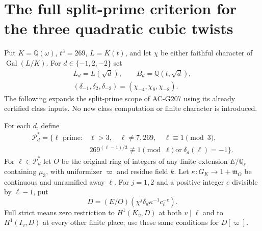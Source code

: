 \section{The full split-prime criterion for the three quadratic cubic twists}
\label{sec:mixed-cubic-split-cube-quadratic}

Put $K=\mathbb Q(\omega)$, $t^3=269$, $L=K(t)$, and let
$\chi$ be either faithful character of $\operatorname{Gal}(L/K)$.
For $d\in\{-1,2,-2\}$ set
\[
 \begin{gathered}
 L_d=L(\sqrt d),\qquad B_d=\mathbb Q(t,\sqrt d),\\
 (\delta_{-1},\delta_2,\delta_{-2})=(\chi_{-4},\chi_8,\chi_{-8}).
 \end{gathered}
 \tag{MCN.1}
\]
The following expands the split-prime scope of AC-G207 using
its already certified class inputs.  No new class computation
or finite character is introduced.

For each $d$, define
\[
 \begin{split}
 \mathscr P_d^* =\{\ell\text{ prime}:{}&\ell>3,\quad\ell\ne7,269,
                    \quad\ell\equiv1\pmod3,\\
 &269^{(\ell-1)/3}\not\equiv1\pmod\ell
                  \ \text{or}\ \delta_d(\ell)=-1\}.
 \end{split}
 \tag{MCN.2}
\]
For $\ell\in\mathscr P_d^*$ let $O$ be the original ring of
integers of any finite extension $E/\mathbb Q_\ell$ containing
$\mu_3$, with uniformizer $\varpi$ and residue field $k$.
Let $\kappa:G_K\to1+\mathfrak m_O$ be continuous and
unramified away $\ell$.  For $j=1,2$ and a positive integer
$e$ divisible by $\ell-1$, put
\[
             D=(E/O)(\chi^j\delta_d\kappa^{-1}c_\ell^{-e}).
 \tag{MCN.3}
\]
Full strict means zero restriction to $H^1(K_v,D)$ at both
$v\mid\ell$ and to $H^1(I_v,D)$ at every other finite place;
use these same conditions for $D[\varpi]$.

